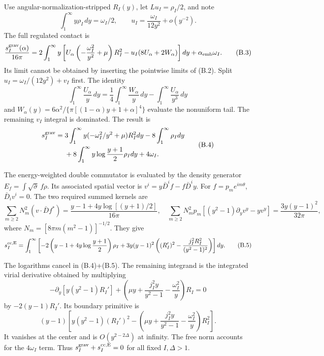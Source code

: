 \documentclass[a4paper,11pt]{article}
\numberwithin{equation}{section}
\begin{document}
Use angular-normalization-stripped \(R_I(y)\), let \(Lu_I=\rho_I/2\), and note \[
\int_1^\infty y\rho_I\,dy=\omega_I/2,\qquad
u_I=\frac{\omega_I}{12y^2}+o(y^{-2}).
\] The full regulated contact is \[
\frac{s_I^{\rm grav}(\alpha)}{16\pi}
=2\int_1^\infty y
\left[U_\alpha\left(-\frac{\omega_I^2}{y^2}+\mu\right)R_I^2
-u_I(8U_\alpha+2W_\alpha)\right]dy
+\alpha_{\rm emb}\omega_I .
\tag{B.3}
\] Its limit cannot be obtained by inserting the pointwise limits of (B.2). Split \(u_I=\omega_I/(12y^2)+v_I\) first. The identity \[
\int_1^\infty\frac{U_\alpha}{y}\,dy
=\frac14\int_1^\infty\frac{W_\alpha}{y}\,dy
-\int_1^\infty\frac{U_\alpha}{y^3}\,dy
\] and \(W_\alpha(y)=6\alpha^2/\{\pi[(1-\alpha)y+1+\alpha]^4\}\) evaluate the nonuniform tail. The remaining \(v_I\) integral is dominated. The result is \[
\begin{aligned}
s_I^{\rm grav}={}&
3\int_1^\infty y(-\omega_I^2/y^2+\mu)R_I^2dy
-8\int_1^\infty\rho_Idy\\
&+8\int_1^\infty y\log\frac{y+1}{2}\rho_Idy+4\omega_I.
\end{aligned}
\tag{B.4}
\]

The energy-weighted double commutator is evaluated by the density generator \(E_f=\int\sqrt{\bar\sigma}\,f\rho\). Its associated spatial vector is \(v^i=y\bar D^if-f\bar D^iy\). For \(f=p_me^{im\theta}\), \(\bar D_iv^i=0\). The two required summed kernels are \[
\sum_{m\ge2}N_m^2(v\cdot\bar Df^*)
=\frac{y-1+4y\log[(y+1)/2]}{16\pi},
\quad
\sum_{m\ge2}N_m^2p_m[(y^2-1)\partial_yv^y-yv^y]
=\frac{3y(y-1)^2}{32\pi},
\] where \(N_m=[8\pi m(m^2-1)]^{-1/2}\). They give \[
\begin{aligned}
s_I^{\rm cc,E}
=\int_1^\infty\left[
-2\left(y-1+4y\log\frac{y+1}{2}\right)\rho_I
+3y(y-1)^2
\left((R_I')^2-\frac{j_I^2R_I^2}{(y^2-1)^2}\right)
\right]dy .
\end{aligned}
\tag{B.5}
\]

The logarithms cancel in (B.4)+(B.5). The remaining integrand is the integrated virial derivative obtained by multiplying \[
-\partial_y[y(y^2-1)R_I']
+\left(\mu y+\frac{j_I^2y}{y^2-1}
-\frac{\omega_I^2}{y}\right)R_I=0
\] by \(-2(y-1)R_I'\). Its boundary primitive is \[
(y-1)\left[
y(y^2-1)(R_I')^2
-\left(\mu y+\frac{j_I^2y}{y^2-1}
-\frac{\omega_I^2}{y}\right)R_I^2
\right].
\tag{B.6}
\] It vanishes at the center and is \(O(y^{2-2\Delta})\) at infinity. The free norm accounts for the \(4\omega_I\) term. Thus \(s_I^{\rm grav}+s_I^{\rm cc,E}=0\) for all fixed \(I,\Delta>1\).
\end{document}
